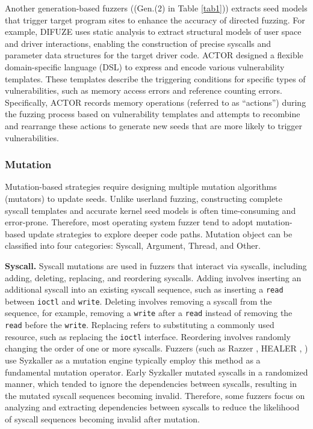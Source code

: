 Another generation-based fuzzers ((\eg Gen.(2) in Table \ref{tab1})) extracts seed models that trigger target program sites to enhance the accuracy of directed fuzzing. For example, DIFUZE \cite{2017DIFUZE} uses static analysis to extract structural models of user space and driver interactions, enabling the construction of precise syscalls and parameter data structures for the target driver code. ACTOR \cite{fleischer2023actor} designed a flexible domain-specific language (DSL) to express and encode various vulnerability templates. These templates describe the triggering conditions for specific types of vulnerabilities, such as memory access errors and reference counting errors. Specifically, ACTOR records memory operations (referred to as ``actions'') during the fuzzing process based on vulnerability templates and attempts to recombine and rearrange these actions to generate new seeds that are more likely to trigger vulnerabilities.


\subsubsection{Mutation}
Mutation-based strategies require designing multiple mutation algorithms (mutators) to update seeds. Unlike userland fuzzing, constructing complete syscall templates and accurate kernel seed models is often time-consuming and error-prone. Therefore, most operating system fuzzer tend to adopt mutation-based update strategies to explore deeper code paths. Mutation object can be classified into four categories: Syscall, Argument, Thread, and Other.

\textbf{Syscall.}
Syscall mutations are used in fuzzers that interact via syscalls, including adding, deleting, replacing, and reordering syscalls. Adding involves inserting an additional syscall into an existing syscall sequence, such as inserting a \texttt{read} between \texttt{ioctl} and \texttt{write}. Deleting involves removing a syscall from the sequence, for example, removing a \texttt{write} after a \texttt{read} instead of removing the \texttt{read} before the \texttt{write}. Replacing refers to substituting a commonly used resource, such as replacing the \texttt{ioctl} interface. Reordering involves randomly changing the order of one or more syscalls. Fuzzers (such as Razzer \cite{jeong2019razzer}, HEALER \cite{sun2021healer}, \etc) use Syzkaller as a mutation engine typically employ this method as a fundamental mutation operator. Early Syzkaller mutated syscalls in a randomized manner, which tended to ignore the dependencies between syscalls, resulting in the mutated syscall sequences becoming invalid. Therefore, some fuzzers \cite{pailoor2018moonshine,sun2021healer,Hao2022DemystifyingTD} focus on analyzing and extracting dependencies between syscalls to reduce the likelihood of syscall sequences becoming invalid after mutation.


